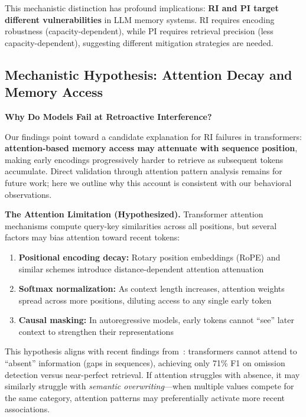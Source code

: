 \documentclass{article}
\begin{document}
This mechanistic distinction has profound implications: \textbf{RI and PI target different vulnerabilities} in LLM memory systems. RI requires encoding robustness (capacity-dependent), while PI requires retrieval precision (less capacity-dependent), suggesting different mitigation strategies are needed.

\subsection{Mechanistic Hypothesis: Attention Decay and Memory Access}

\textbf{Why Do Models Fail at Retroactive Interference?}

Our findings point toward a candidate explanation for RI failures in transformers: \textbf{attention-based memory access may attenuate with sequence position}, making early encodings progressively harder to retrieve as subsequent tokens accumulate. Direct validation through attention pattern analysis remains for future work; here we outline why this account is consistent with our behavioral observations.

\textbf{The Attention Limitation (Hypothesized).}
Transformer attention mechanisms compute query-key similarities across all positions, but several factors may bias attention toward recent tokens:
\begin{enumerate}[itemsep=2pt,topsep=3pt,parsep=0pt]
    \item \textbf{Positional encoding decay:} Rotary position embeddings (RoPE) and similar schemes introduce distance-dependent attention attenuation
    \item \textbf{Softmax normalization:} As context length increases, attention weights spread across more positions, diluting access to any single early token
    \item \textbf{Causal masking:} In autoregressive models, early tokens cannot ``see'' later context to strengthen their representations
\end{enumerate}

This hypothesis aligns with recent findings from~\citet{fu2025absencebench}: transformers cannot attend to ``absent'' information (gaps in sequences), achieving only 71\% F1 on omission detection versus near-perfect retrieval. If attention struggles with absence, it may similarly struggle with \textit{semantic overwriting}---when multiple values compete for the same category, attention patterns may preferentially activate more recent associations.
\end{document}
